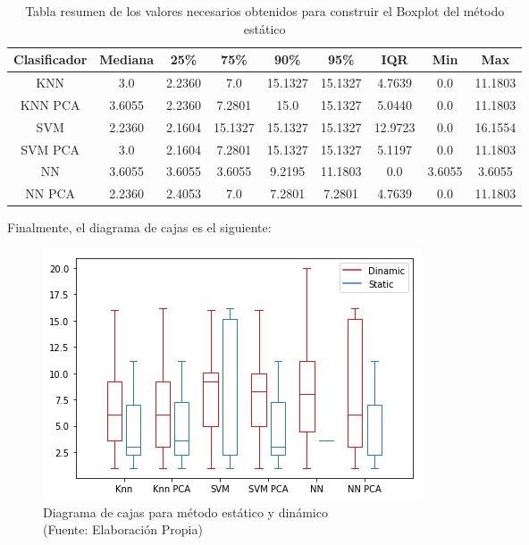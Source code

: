 \newpage

\begin{table}[!ht]
\centering
\caption[Tabla Boxplot método estático]{Tabla resumen de los valores necesarios obtenidos para construir el Boxplot del método estático}
\label{tabla-boxplot-estatico}
\begin{tabular}{|c|c|c|c|c|c|c|c|c|}
\hline
\textbf{Clasificador} & \textbf{Mediana} & \textbf{25\%} & \textbf{75\%} & \textbf{90\%} & \textbf{95\%} & \textbf{IQR} & \textbf{Min} & \textbf{Max} \\ \hline
KNN                   & 3.0              & 2.2360        & 7.0           & 15.1327       & 15.1327       & 4.7639       & 0.0          & 11.1803      \\ \hline
KNN PCA               & 3.6055           & 2.2360        & 7.2801        & 15.0          & 15.1327       & 5.0440       & 0.0          & 11.1803      \\ \hline
SVM                   & 2.2360           & 2.1604        & 15.1327       & 15.1327       & 15.1327       & 12.9723      & 0.0          & 16.1554      \\ \hline
SVM PCA               & 3.0              & 2.1604        & 7.2801        & 15.1327       & 15.1327       & 5.1197      & 0.0          & 11.1803      \\ \hline
NN                    & 3.6055           & 3.6055        & 3.6055        & 9.2195        & 11.1803       & 0.0          & 3.6055       & 3.6055       \\ \hline
NN PCA                & 2.2360           & 2.4053        & 7.0           & 7.2801        & 7.2801        & 4.7639       & 0.0          & 11.1803      \\ \hline
\end{tabular}
\end{table}

Finalmente, el diagrama de cajas es el siguiente:

\begin{figure}[ht!]
\centering
\includegraphics[width=.6\textwidth]{figures/boxplot.png}
\caption[Diagrama de cajas para método estático y dinámico]{Diagrama de cajas para método estático y dinámico \\
{\scriptsize (Fuente: Elaboración Propia)}}
\label{fig:boxplot}
\end{figure}

